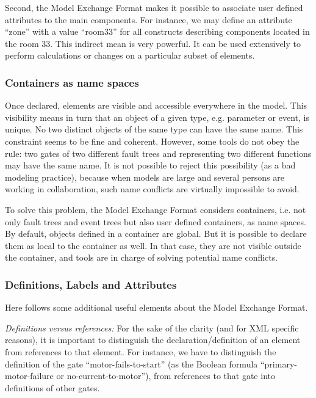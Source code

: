 \documentclass[11pt]{article}
\begin{document}
Second, the Model Exchange Format makes it possible to associate user
defined attributes to the main components. For instance, we may define
an attribute ``zone'' with a value ``room33'' for all constructs describing
components located in the room 33. This indirect mean is very powerful.
It can be used extensively to perform calculations or changes on a
particular subset of elements.

\subsubsection{Containers as name spaces}
\label{sec:org84fd28c}

Once declared, elements are visible and accessible everywhere in the
model. This visibility means in turn that an object of a given type,
e.g. parameter or event, is unique. No two distinct objects of the same
type can have the same name. This constraint seems to be fine and
coherent. However, some tools do not obey the rule: two gates of two
different fault trees and representing two different functions may have
the same name. It is not possible to reject this possibility (as a bad
modeling practice), because when models are large and several persons
are working in collaboration, such name conflicts are virtually
impossible to avoid.

To solve this problem, the Model Exchange Format considers containers,
i.e. not only fault trees and event trees but also user defined
containers, as name spaces. By default, objects defined in a container
are global. But it is possible to declare them as local to the container
as well. In that case, they are not visible outside the container, and
tools are in charge of solving potential name conflicts.

\subsubsection{Definitions, Labels and Attributes}
\label{sec:org5f473ee}

Here follows some additional useful elements about the Model Exchange
Format.

\emph{Definitions versus references:} For the sake of the clarity (and for
XML specific reasons), it is important to distinguish the
declaration/definition of an element from references to that element.
For instance, we have to distinguish the definition of the gate
``motor-fails-to-start'' (as the Boolean formula ``primary-motor-failure or
no-current-to-motor''), from references to that gate into definitions of
other gates.
\end{document}
